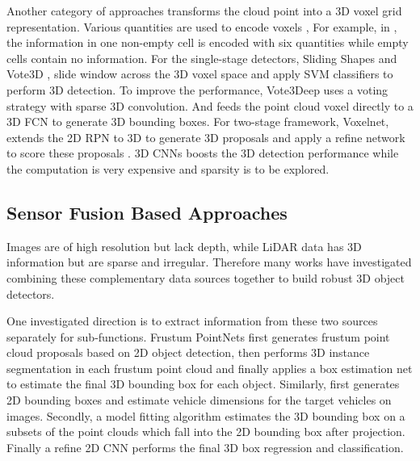 Another category of approaches transforms the cloud point into a 3D voxel grid representation. Various quantities are used to encode voxels \cite{10.1007/978-3-319-10599-4_41, 7780463, DBLP:journals/corr/Li16p, Wang-RSS-15, DBLP:journals/corr/EngelckeRWTP16}, For example, in \cite{Wang-RSS-15, DBLP:journals/corr/EngelckeRWTP16}, the information in one non-empty cell is encoded with six quantities while empty cells contain no information. For the single-stage detectors, \eg Sliding Shapes \cite{10.1007/978-3-319-10599-4_41} and Vote3D \cite{Wang-RSS-15}, slide window across the 3D voxel space and apply SVM classifiers to perform 3D detection. To improve the performance, Vote3Deep \cite{DBLP:journals/corr/EngelckeRWTP16} uses a voting strategy with sparse 3D convolution. And \cite{DBLP:journals/corr/Li16p} feeds the point cloud voxel directly to a 3D FCN to generate 3D bounding boxes. For two-stage framework, \eg Voxelnet,  extends the 2D RPN \cite{DBLP:journals/corr/RenHG015} to 3D to generate 3D proposals and  apply a refine network to score these proposals \cite{DBLP:journals/corr/abs-1711-06396}. 3D CNNs boosts the 3D detection performance while the computation is very expensive and sparsity is to be explored.  


\subsection{Sensor Fusion Based Approaches}

Images are of high resolution but lack depth, while LiDAR data has 3D information but are sparse and irregular. Therefore many works have investigated combining these complementary data sources together to build robust 3D object detectors. 

One investigated direction is to extract information from these two sources separately for sub-functions.
Frustum PointNets \cite{DBLP:journals/corr/abs-1711-08488} first generates frustum point cloud proposals based on 2D object detection, then performs 3D instance segmentation in each frustum point cloud and finally applies a box estimation net to estimate the final 3D bounding box for each object. Similarly, \cite{DBLP:journals/corr/abs-1803-00387} first generates 2D bounding boxes and estimate vehicle dimensions for the target vehicles on images. Secondly, a model fitting algorithm estimates the 3D bounding box on a subsets of the point clouds which fall into the 2D bounding box after projection. Finally a refine 2D CNN performs the final 3D box regression and classification.



